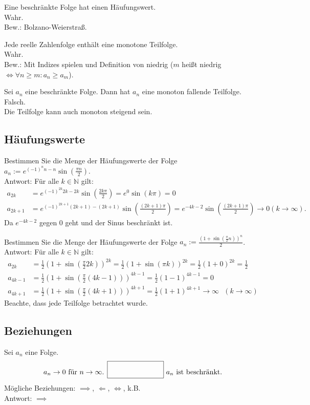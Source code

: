 \documentclass[parskip=full]{scrartcl}
\begin{document}
Eine beschränkte Folge hat einen Häufungswert.\\
Wahr.\\
Bew.: Bolzano-Weierstraß.

Jede reelle Zahlenfolge enthält eine monotone Teilfolge.\\
Wahr.\\
Bew.: Mit Indizes spielen und Definition von niedrig ($m$ heißt niedrig $\iff \forall n \geq m : a_n \geq a_m$).

Sei $a_n$ eine beschränkte Folge.
Dann hat $a_n$ eine monoton fallende Teilfolge.\\
Falsch.\\
Die Teilfolge kann auch monoton steigend sein.

\subsection{Häufungswerte}
Bestimmen Sie die Menge der Häufungswerte der Folge $a_n := e^{(-1)^{n}n-n} \sin\left(\frac{\pi n}{2}\right)$.\\
Antwort:
Für alle $k \in \mathbb{N}$ gilt:
\begin{align*}
  a_{2k} &= e^{(-1)^{2k}2k-2k}\sin\left(\frac{2k\pi}{2}\right) = e^0 \sin(k\pi) = 0\\
  a_{2k+1} &= e^{(-1)^{2k+1}(2k+1)-(2k+1)}\sin\left(\frac{(2k+1)\pi}{2}\right) = e^{-4k-2} \sin\left(\frac{(2k+1)\pi}{2}\right) \to 0 (k \to \infty).
\end{align*}
Da $e^{-4k-2}$ gegen $0$ geht und der Sinus beschränkt ist.

Bestimmen Sie die Menge der Häufungswerte der Folge $a_n := \frac{\left(1+\sin\left(\frac{\pi}{2}n\right)\right)^n}{2}$.\\
Antwort: Für alle $k \in \mathbb{N}$ gilt:
\begin{align*}
  a_{2k} &= \frac{1}{2} \left(1+\sin\left(\frac{\pi}{2}2k\right)\right)^{2k} = \frac{1}{2} \left(1+\sin\left(\pi k\right)\right)^{2k} = \frac{1}{2} (1 + 0)^{2k} = \frac{1}{2}\\
  a_{4k-1} &= \frac{1}{2} \left(1+\sin\left(\frac{\pi}{2}(4k-1)\right)\right)^{4k-1} = \frac{1}{2} (1 - 1)^{4k-1} = 0\\
  a_{4k+1} &= \frac{1}{2} \left(1+\sin\left(\frac{\pi}{2}(4k+1)\right)\right)^{4k+1} = \frac{1}{2} (1 + 1)^{4k+1} \to \infty \text{ } (k \to \infty) 
\end{align*}
Beachte, dass jede Teilfolge betrachtet wurde.

\subsection{Beziehungen}
Sei $a_n$ eine Folge.
\begin{displaymath}
  a_n \to 0 \text{ für } n \to \infty \text{. } \fbox{\rule{1in}{0pt}\rule[-0.5ex]{0pt}{4ex}} \text{ $a_n$ ist beschränkt.}
\end{displaymath}
Mögliche Beziehungen:
$\implies$, $\Leftarrow$, $\iff$, k.B.\\
Antwort: $\implies$
\end{document}
